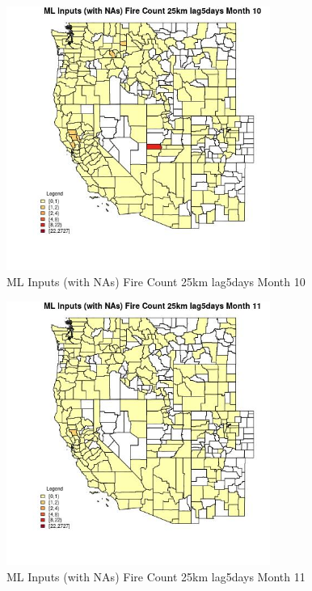 \begin{figure} 
\centering  
\includegraphics[width=0.77\textwidth]{Code_Outputs/Report_ML_input_PM25_Step4_part_f_de_duplicated_aves_prioritize_24hr_obswNAs_CountyFire_Count_25km_lag5daysmedianMonth10.jpg} 
\caption{\label{fig:Report_ML_input_PM25_Step4_part_f_de_duplicated_aves_prioritize_24hr_obswNAsCountyFire_Count_25km_lag5daysmedianMonth10}ML Inputs (with NAs) Fire Count 25km lag5days Month 10} 
\end{figure} 
 

\clearpage 

\begin{figure} 
\centering  
\includegraphics[width=0.77\textwidth]{Code_Outputs/Report_ML_input_PM25_Step4_part_f_de_duplicated_aves_prioritize_24hr_obswNAs_CountyFire_Count_25km_lag5daysmedianMonth11.jpg} 
\caption{\label{fig:Report_ML_input_PM25_Step4_part_f_de_duplicated_aves_prioritize_24hr_obswNAsCountyFire_Count_25km_lag5daysmedianMonth11}ML Inputs (with NAs) Fire Count 25km lag5days Month 11} 
\end{figure} 
 

